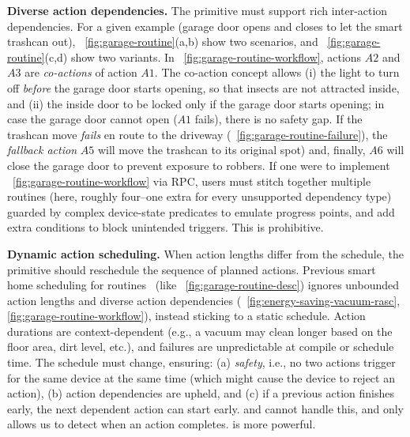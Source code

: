 \noindent \textbf{Diverse action dependencies.}
The primitive must support rich inter-action dependencies. For a given example (garage door opens and closes to let the smart trashcan out), \Figures~\ref{fig:garage-routine}(a,b) show two scenarios, and \Figures~\ref{fig:garage-routine}(c,d) show two variants. 
In 
\Figure~\ref{fig:garage-routine-workflow},
actions $A2$ and $A3$ are \textit{co-actions} of action $A1$. The co-action concept allows (i) the light to turn off {\it before} the garage door starts opening, so that insects are not attracted inside, and (ii) the inside door to be locked only if the garage door starts opening; in case the garage door cannot open ($A1$ fails), there is no safety gap. 
If the trashcan move \textit{fails} en route to the driveway (\Figure~\ref{fig:garage-routine-failure}), the \textit{fallback action} $A5$ will move the trashcan to its original spot) and, finally, $A6$ will close the garage door 
to prevent exposure to robbers. 
If one were to implement \Figure~\ref{fig:garage-routine-workflow} via RPC, 
users must stitch together multiple routines (here, roughly four--one extra for every unsupported dependency type) guarded by complex device-state predicates to emulate progress points, and add extra conditions to block unintended triggers. This is prohibitive. 

\noindent \textbf{Dynamic action scheduling.}
When action lengths differ from the schedule, the primitive should reschedule the sequence of planned actions. 
Previous smart home scheduling for routines~\cite{SafeHomeEuroSys2021}  
(like \Figure~\ref{fig:garage-routine-desc}) ignores
unbounded  action lengths and diverse action dependencies (\Figures~\ref{fig:energy-saving-vacuum-rasc}, \ref{fig:garage-routine-workflow}), instead sticking to a static schedule.
Action durations are context-dependent (e.g., a vacuum may clean longer based on the floor area, dirt level, etc.), and failures are unpredictable at compile or schedule time. 
The schedule must change, ensuring: (a) \textit{safety}, i.e., no two actions trigger for the same device at the same time (which might cause the device to reject an action),  (b) action dependencies are upheld, and (c) if a previous action finishes early, the next dependent action can start early.
\RPCa{} and \RPCs{} cannot handle this, and \RPCc{} only allows us to detect when an action completes. \abstraction{} is more powerful. 